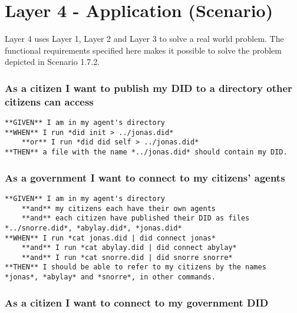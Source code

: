 \hypertarget{layer-4---application-scenario}{%
\section{Layer 4 - Application
(Scenario)}\label{layer-4---application-scenario}}

Layer 4 uses Layer 1, Layer 2 and Layer 3 to solve a real world problem.
The functional requirements specified here makes it possible to solve
the problem depicted in Scenario 1.7.2.

\hypertarget{as-a-citizen-i-want-to-publish-my-did-to-a-directory-other-citizens-can-access}{%
\subsubsection{As a citizen I want to publish my DID to a directory
other citizens can
access}\label{as-a-citizen-i-want-to-publish-my-did-to-a-directory-other-citizens-can-access}}

\begin{lstlisting}
**GIVEN** I am in my agent's directory
**WHEN** I run *did init > ../jonas.did*
    **or** I run *did did self > ../jonas.did*
**THEN** a file with the name *../jonas.did* should contain my DID.
\end{lstlisting}

\hypertarget{as-a-government-i-want-to-connect-to-my-citizens-agents}{%
\subsubsection{As a government I want to connect to my citizens'
agents}\label{as-a-government-i-want-to-connect-to-my-citizens-agents}}

\begin{lstlisting}
**GIVEN** I am in my agent's directory
    **and** my citizens each have their own agents
    **and** each citizen have published their DID as files *../snorre.did*, *abylay.did*, *jonas.did*
**WHEN** I run *cat jonas.did | did connect jonas*
    **and** I run *cat abylay.did | did connect abylay*
    **and** I run *cat snorre.did | did snorre snorre*
**THEN** I should be able to refer to my citizens by the names *jonas*, *abylay* and *snorre*, in other commands.
\end{lstlisting}

\hypertarget{as-a-citizen-i-want-to-connect-to-my-government-did}{%
\subsubsection{As a citizen I want to connect to my government
DID}\label{as-a-citizen-i-want-to-connect-to-my-government-did}}

